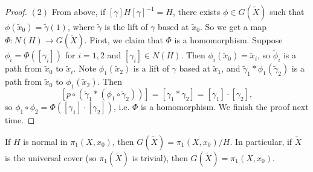 \begin{proof}
  $(2)$ From above, if $[\gamma] H [\gamma]^{-1} = H$,
  there exists $\phi \in G(\widetilde{X})$ such that
  $\phi(\widetilde{x}_0) = \widetilde{\gamma}(1)$,
  where $\widetilde{\gamma}$ is the lift of $\gamma$
  based at $\widetilde{x}_0$. So we get a map
  $\Phi : N(H) \to G(\widetilde{X})$. First,
  we claim that $\Phi$ is a homomorphism.
  Suppose $\phi_i = \Phi([\gamma_i])$ for
  $i = 1, 2$ and $[\gamma_i] \in N(H)$. Then
  $\phi_i(\widetilde{x}_0) = \widetilde{x}_i$, so
  $\widetilde{\phi}_i$ is a path from
  $\widetilde{x}_0$ to $\widetilde{x}_i$. Note
  $\phi_1(\widetilde{x}_2)$ is a lift
  of $\gamma$ based at $\widetilde{x}_1$, and
  $\widetilde{\gamma}_1 * \phi_{1}(\widetilde{\gamma}_2)$
  is a path from $\widetilde{x}_0$ to $\phi_1(\widetilde{x}_2)$.
  Then
  \[
    [p \circ (\widetilde{\gamma}_1 * (\phi_1 \circ \widetilde{\gamma}_2))]
    = [\gamma_1 * \gamma_2]
    = [\gamma_1] \cdot [\gamma_2],
  \]
  so $\phi_1 \circ \phi_2 = \Phi([\gamma_1] \cdot [\gamma_2])$, i.e.
  $\Phi$ is a homomorphism.
  We finish the proof next time.
\end{proof}

\begin{remark}
  If $H$ is normal in $\pi_1(X, x_0)$, then
  $G(\widetilde{X}) = \pi_1(X, x_0) / H$.
  In particular, if $\widetilde{X}$ is the universal
  cover (so $\pi_1(\widetilde{X})$ is trivial), then
  $G(\widetilde{X}) = \pi_1(X, x_0)$.
\end{remark}
